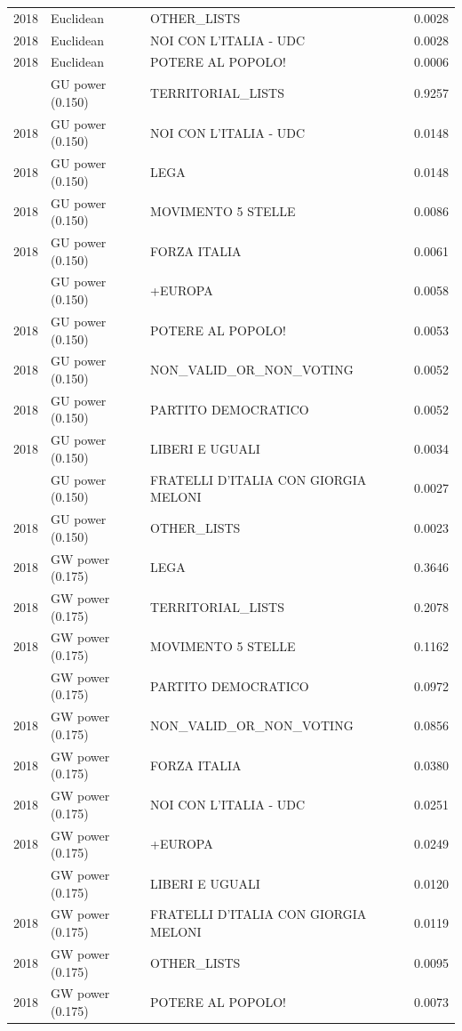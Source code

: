 \begin{longtable}[t]{rllr}
2018 & Euclidean & OTHER\_LISTS & 0.0028\\
2018 & Euclidean & NOI CON L'ITALIA - UDC & 0.0028\\
2018 & Euclidean & POTERE AL POPOLO! & 0.0006\\
\addlinespace
2018 & GU power (0.150) & TERRITORIAL\_LISTS & 0.9257\\
2018 & GU power (0.150) & NOI CON L'ITALIA - UDC & 0.0148\\
2018 & GU power (0.150) & LEGA & 0.0148\\
2018 & GU power (0.150) & MOVIMENTO 5 STELLE & 0.0086\\
2018 & GU power (0.150) & FORZA ITALIA & 0.0061\\
\addlinespace
2018 & GU power (0.150) & +EUROPA & 0.0058\\
2018 & GU power (0.150) & POTERE AL POPOLO! & 0.0053\\
2018 & GU power (0.150) & NON\_VALID\_OR\_NON\_VOTING & 0.0052\\
2018 & GU power (0.150) & PARTITO DEMOCRATICO & 0.0052\\
2018 & GU power (0.150) & LIBERI E UGUALI & 0.0034\\
\addlinespace
2018 & GU power (0.150) & FRATELLI D'ITALIA CON GIORGIA MELONI & 0.0027\\
2018 & GU power (0.150) & OTHER\_LISTS & 0.0023\\
2018 & GW power (0.175) & LEGA & 0.3646\\
2018 & GW power (0.175) & TERRITORIAL\_LISTS & 0.2078\\
2018 & GW power (0.175) & MOVIMENTO 5 STELLE & 0.1162\\
\addlinespace
2018 & GW power (0.175) & PARTITO DEMOCRATICO & 0.0972\\
2018 & GW power (0.175) & NON\_VALID\_OR\_NON\_VOTING & 0.0856\\
2018 & GW power (0.175) & FORZA ITALIA & 0.0380\\
2018 & GW power (0.175) & NOI CON L'ITALIA - UDC & 0.0251\\
2018 & GW power (0.175) & +EUROPA & 0.0249\\
\addlinespace
2018 & GW power (0.175) & LIBERI E UGUALI & 0.0120\\
2018 & GW power (0.175) & FRATELLI D'ITALIA CON GIORGIA MELONI & 0.0119\\
2018 & GW power (0.175) & OTHER\_LISTS & 0.0095\\
2018 & GW power (0.175) & POTERE AL POPOLO! & 0.0073\\

\end{longtable}
